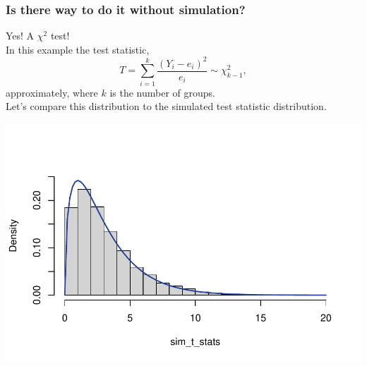 \documentclass[a4paper]{article}
\begin{document}
\subsubsection{Is there way to do it without simulation?}
Yes! A \( \chi^2 \) test!\\
In this example the test statistic,
\[
	T = \sum_{i=1}^{k} \frac{(Y_i - e_i)^2}{e_i} \sim \chi^2_{k-1},
\]
approximately, where \( k \) is the number of groups.\\
Let's compare this distribution to the simulated test statistic distribution.
\begin{Schunk}


{\centering \includegraphics[width=\maxwidth]{figure/listings-unnamed-chunk-23-1} 

}

\end{Schunk}
\end{document}
